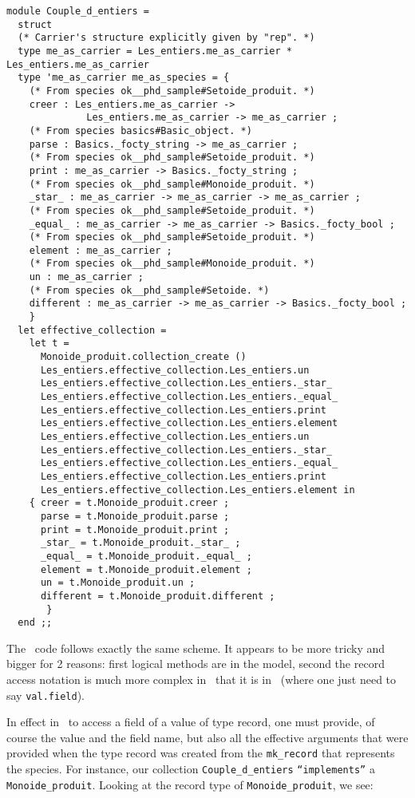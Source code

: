 {\begin{lstlisting}[language=MyOCaml, title=\ocaml\ code for collections]
module Couple_d_entiers =
  struct
  (* Carrier's structure explicitly given by "rep". *)
  type me_as_carrier = Les_entiers.me_as_carrier * Les_entiers.me_as_carrier
  type 'me_as_carrier me_as_species = {
    (* From species ok__phd_sample#Setoide_produit. *)
    creer : Les_entiers.me_as_carrier ->
              Les_entiers.me_as_carrier -> me_as_carrier ;
    (* From species basics#Basic_object. *)
    parse : Basics._focty_string -> me_as_carrier ;
    (* From species ok__phd_sample#Setoide_produit. *)
    print : me_as_carrier -> Basics._focty_string ;
    (* From species ok__phd_sample#Monoide_produit. *)
    _star_ : me_as_carrier -> me_as_carrier -> me_as_carrier ;
    (* From species ok__phd_sample#Setoide_produit. *)
    _equal_ : me_as_carrier -> me_as_carrier -> Basics._focty_bool ;
    (* From species ok__phd_sample#Setoide_produit. *)
    element : me_as_carrier ;
    (* From species ok__phd_sample#Monoide_produit. *)
    un : me_as_carrier ;
    (* From species ok__phd_sample#Setoide. *)
    different : me_as_carrier -> me_as_carrier -> Basics._focty_bool ;
    }
  let effective_collection =
    let t =
      Monoide_produit.collection_create ()
      Les_entiers.effective_collection.Les_entiers.un
      Les_entiers.effective_collection.Les_entiers._star_
      Les_entiers.effective_collection.Les_entiers._equal_
      Les_entiers.effective_collection.Les_entiers.print
      Les_entiers.effective_collection.Les_entiers.element
      Les_entiers.effective_collection.Les_entiers.un
      Les_entiers.effective_collection.Les_entiers._star_
      Les_entiers.effective_collection.Les_entiers._equal_
      Les_entiers.effective_collection.Les_entiers.print
      Les_entiers.effective_collection.Les_entiers.element in
    { creer = t.Monoide_produit.creer ;
      parse = t.Monoide_produit.parse ;
      print = t.Monoide_produit.print ;
      _star_ = t.Monoide_produit._star_ ;
      _equal_ = t.Monoide_produit._equal_ ;
      element = t.Monoide_produit.element ;
      un = t.Monoide_produit.un ;
      different = t.Monoide_produit.different ;
       }
  end ;;
\end{lstlisting}}

The \coq\ code follows exactly the same scheme. It appears to be more
tricky and bigger for 2 reasons: first logical methods are in the
model, second the record access notation is much more complex in
\coq\ that it is in \ocaml\ (where one just need to say
{\tt val.field}).

In effect in \coq\, to access a field of a value of type record, one
must provide, of course the value and the field name, but also all the
effective arguments that were provided when the type record was
created from the {\tt mk\_record}
\label{mk-record-introduction2}
that represents the species.
For instance, our collection {\tt Couple\_d\_entiers}
{\tt ``implements''} a {\tt Monoide\_produit}. Looking at the record
type of {\tt Monoide\_produit}, we see:


